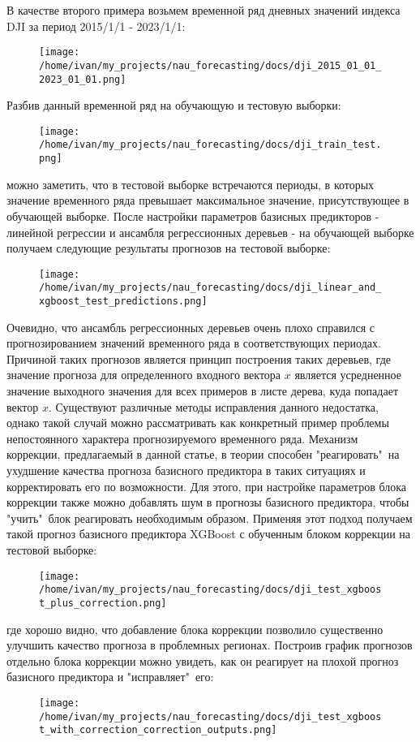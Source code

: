 \documentclass[11pt]{article}
\begin{document}
В качестве второго примера возьмем временной ряд дневных значений индекса DJI за период 2015/1/1 - 2023/1/1:
\begin{figure}[H]
\centering
\texttt{[image: /home/ivan/my\_projects/nau\_forecasting/docs/dji\_2015\_01\_01\_2023\_01\_01.png]}
\label{}
\end{figure}

Разбив данный временной ряд на обучающую и тестовую выборки:
\begin{figure}[H]
\centering
\texttt{[image: /home/ivan/my\_projects/nau\_forecasting/docs/dji\_train\_test.png]}
\label{}
\end{figure}

можно заметить, что в тестовой выборке встречаются периоды, в которых значение временного ряда превышает максимальное значение, присутствующее в обучающей выборке. После настройки параметров базисных предикторов - линейной регрессии и ансамбля регрессионных деревьев - на обучающей выборке получаем следующие результаты прогнозов на тестовой выборке:
\begin{figure}[H]
\centering
\texttt{[image: /home/ivan/my\_projects/nau\_forecasting/docs/dji\_linear\_and\_xgboost\_test\_predictions.png]}
\label{}
\end{figure}
Очевидно, что ансамбль регрессионных деревьев очень плохо справился с прогнозированием значений временного ряда в соответствующих периодах. Причиной таких прогнозов является принцип построения таких деревьев, где значение прогноза для определенного входного вектора $x$ является усредненное значение выходного значения для всех примеров в листе дерева, куда попадает вектор $x$. Существуют различные методы исправления данного недостатка, однако такой случай можно рассматривать как конкретный пример проблемы непостоянного характера прогнозируемого временного ряда. Механизм коррекции, предлагаемый в данной статье, в теории способен "реагировать"\ на ухудшение качества прогноза базисного предиктора в таких ситуациях и корректировать его по возможности. Для этого, при настройке параметров блока коррекции также можно добавлять шум в прогнозы базисного предиктора, чтобы "учить"\ блок реагировать необходимым образом. Применяя этот подход получаем такой прогноз базисного предиктора XGBoost с обученным блоком коррекции на тестовой выборке:
\begin{figure}[H]
\centering
\texttt{[image: /home/ivan/my\_projects/nau\_forecasting/docs/dji\_test\_xgboost\_plus\_correction.png]}
\label{}
\end{figure}
где хорошо видно, что добавление блока коррекции позволило существенно улучшить качество прогноза в проблемных регионах. Построив график прогнозов отдельно блока коррекции можно увидеть, как он реагирует на плохой прогноз базисного предиктора и "исправляет"\ его:
\begin{figure}[H]
\centering
\texttt{[image: /home/ivan/my\_projects/nau\_forecasting/docs/dji\_test\_xgboost\_with\_correction\_correction\_outputs.png]}
\label{}
\end{figure}
\end{document}
